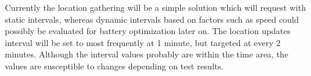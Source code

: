 Currently the location gathering will be a simple solution which will request with static intervals, whereas dynamic intervals based on factors such as speed could possibly be evaluated for battery optimization later on.
The location updates interval will be set to most frequently at 1 minute, but targeted at every 2 minutes.
Although the interval values probably are within the time area, the values are susceptible to changes depending on test results.